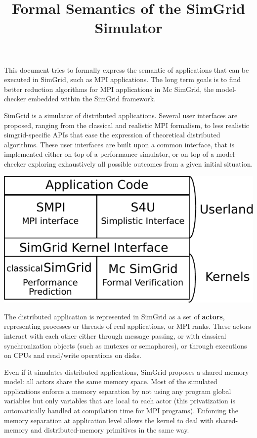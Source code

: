 \documentclass[a4paper,11pt]{article}
\title{Formal Semantics of the SimGrid Simulator}
\begin{document}
\maketitle

This document tries to formally express the semantic of applications that can be executed in SimGrid, such as MPI applications. The long term goals is to find better reduction algorithms for MPI applications in Mc SimGrid, the model-checker embedded within the SimGrid framework.

\medskip

SimGrid is a simulator of distributed applications. Several user interfaces are proposed, ranging from the classical and realistic MPI formalism, to less realistic simgrid-specific APIs that ease the expression of theoretical distributed algorithms. These user interfaces are built upon a common interface, that is implemented either on top of a performance simulator, or on top of a model-checker exploring exhaustively all possible outcomes from a given initial situation.

\centerline{\includegraphics[scale=.6]{simgrid-architecture.pdf}}

The distributed application is represented in SimGrid as a set of \textbf{actors}, representing  
processes or threads of real applications, or MPI ranks. These actors  interact with each other either through message passing, or with classical synchronization objects (such as mutexes or semaphores), or through executions on CPUs and read/write  operations on disks.

Even if it simulates distributed applications, SimGrid proposes a shared memory model: all actors share the same memory space. Most of the simulated applications enforce a memory separation by not using any program global variables but only variables that are local to each actor (this privatization is automatically handled at compilation time for MPI programs). Enforcing the memory separation at application level allows the kernel to deal with shared-memory and distributed-memory primitives in the same way.
\end{document}
